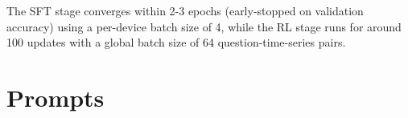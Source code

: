 The SFT stage converges within 2-3 epochs (early-stopped on validation accuracy) using a per-device batch size of 4, while the RL stage runs for around 100 updates with a global batch size of 64 question-time-series pairs.





\section{Prompts}
\label{app:prompt}

